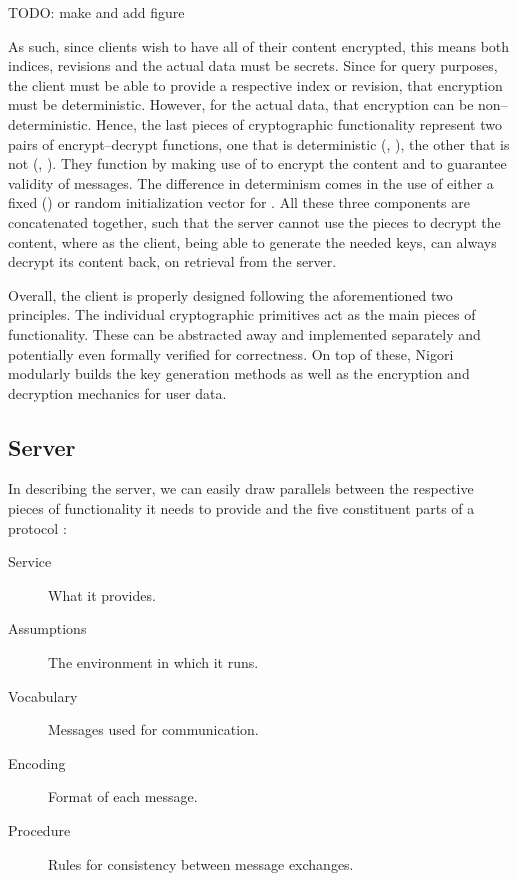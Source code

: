 TODO: make and add figure

As such, since clients wish to have all of their content encrypted, this means both indices, revisions and the actual data must be secrets.
Since for query purposes, the client must be able to provide a respective index or revision, that encryption must be deterministic.
However, for the actual data, that encryption can be non--deterministic.
Hence, the last pieces of cryptographic functionality represent two pairs of encrypt--decrypt functions, one that is deterministic (, ), the other that is not (, ).
They function by making use of  to encrypt the content and  to guarantee validity of messages.
The difference in determinism comes in the use of either a fixed () or random initialization vector for .
All these three components are concatenated together, such that the server cannot use the pieces to decrypt the content, where as the client, being able to generate the needed keys, can always decrypt its content back, on retrieval from the server.

Overall, the client is properly designed following the aforementioned two principles.
The individual cryptographic primitives act as the main pieces of functionality.
These can be abstracted away and implemented separately and potentially even formally verified for correctness.
On top of these, Nigori modularly builds the key generation methods as well as the encryption and decryption mechanics for user data.

\subsection{Server}
In describing the server, we can easily draw parallels between the respective pieces of functionality it needs to provide and the five constituent parts of a protocol \cite{ProtocolDesign}:
\begin{description}
  \item[Service] What it provides.
  \item[Assumptions] The environment in which it runs.
  \item[Vocabulary] Messages used for communication.
  \item[Encoding] Format of each message.
  \item[Procedure] Rules for consistency between message exchanges.
\end{description}

